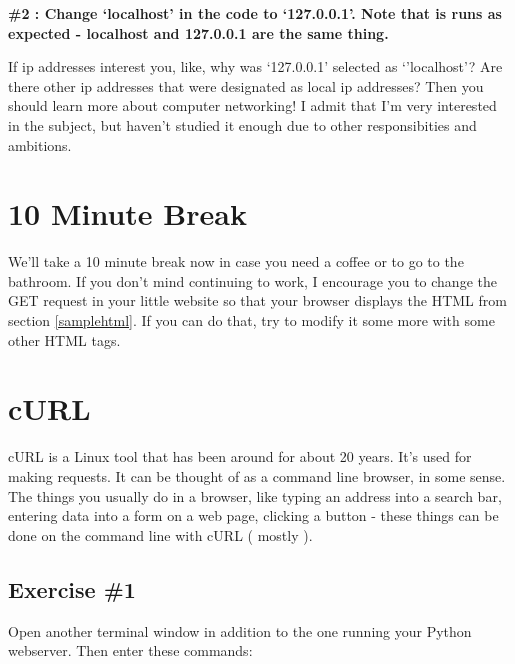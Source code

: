 \documentclass[10pt]{article}
\begin{document}
\begin{center}
\textbf{\#2 : Change `localhost' in the code to `127.0.0.1'. Note that is runs as expected - localhost and 127.0.0.1 are the same thing.}
\end{center}

If ip addresses interest you, like, why was `127.0.0.1' selected as `'localhost'? Are there other ip addresses that were designated as local ip addresses? Then you should learn more about computer networking! I admit that I'm very interested in the subject, but haven't studied it enough due to other responsibities and ambitions.


\section{10 Minute Break}
We'll take a 10 minute break now in case you need a coffee or to go to the bathroom. If you don't mind continuing to work, I encourage you to change the GET request in your little website so that your browser displays the HTML from section \ref{samplehtml}. If you can do that, try to modify it some more with some other HTML tags.

\section{cURL}
cURL is a Linux tool that has been around for about 20 years. It's used for making requests. It can be thought of as a command line browser, in some sense. The things you usually do  in a browser, like typing an address into a search bar, entering data into a form on a web page, clicking a button - these things can be done on the command line with cURL ( mostly ).

\subsection{Exercise \#1}
Open another terminal window in addition to the one running your Python webserver. Then enter these commands:
\end{document}
